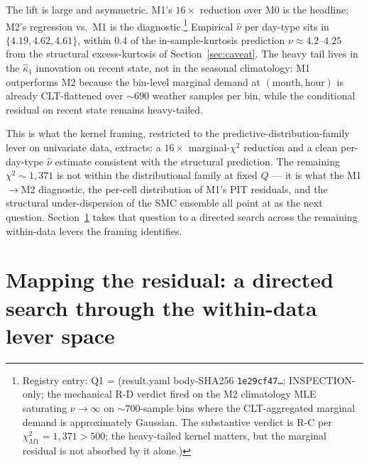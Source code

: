 The lift is large and asymmetric. M1's $16\times$ reduction over
M0 is the headline; M2's regression vs.\ M1 is the
diagnostic.\footnote{Registry entry: Q1 =
 (result.yaml body-SHA256
\texttt{1e29cf47\ldots}; INSPECTION-only; the mechanical R-D
verdict fired on the M2 climatology MLE saturating $\nu \to \infty$
on $\sim 700$-sample bins where the CLT-aggregated marginal demand
is approximately Gaussian. The substantive verdict is R-C per
$\chi^{2}_{M1} = 1{,}371 > 500$; the heavy-tailed kernel matters,
but the marginal residual is not absorbed by it alone.)} Empirical
$\hat\nu$ per day-type sits in $\{4.19, 4.62, 4.61\}$, within
$0.4$ of the in-sample-kurtosis prediction $\nu \approx 4.2$--$4.25$
from the structural excess-kurtosis of Section~\ref{sec:caveat}.
The heavy tail lives in the $\hat\kappa_1$ innovation on recent
state, not in the seasonal climatology: M1 outperforms M2 because
the bin-level marginal demand at $(\text{month}, \text{hour})$ is
already CLT-flattened over $\sim 690$ weather samples per bin,
while the conditional residual on recent state remains heavy-tailed.

This is what the kernel framing, restricted to the
predictive-distribution-family lever on univariate data, extracts:
a $16\times$ marginal-$\chi^{2}$ reduction and a clean per-day-type
$\hat\nu$ estimate consistent with the structural prediction.
The remaining $\chi^{2} \sim 1{,}371$ is not within the
distributional family at fixed $Q$ --- it is what the M1$\to$M2
diagnostic, the per-cell distribution of M1's PIT residuals, and
the structural under-dispersion of the SMC ensemble all point at
as the next question. Section~\ref{sec:directed-search} takes that
question to a directed search across the remaining within-data
levers the framing identifies.

\section{Mapping the residual: a directed search through the
within-data lever space}
\label{sec:directed-search}

